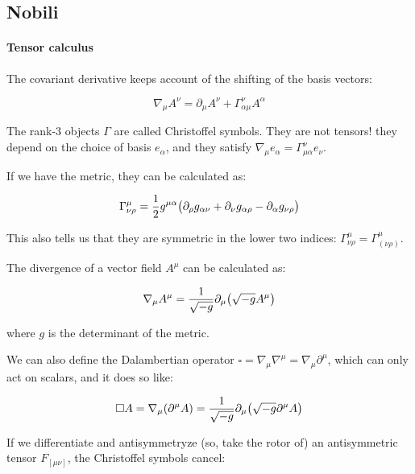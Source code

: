 \subsection{Nobili}

\paragraph{Tensor calculus}

The covariant derivative keeps account of the shifting of the basis vectors:

\begin{equation}
    \nabla_\mu A^\nu = \partial_\mu A^\nu + \Gamma^\nu _{\alpha \mu}  A^\alpha
\end{equation}

The rank-3 objects $\Gamma$ are called Christoffel symbols. They are not tensors! they depend on the choice of basis $e_\alpha$, and they satisfy $\nabla _\mu e_\alpha = \Gamma ^\nu _{\mu \alpha} e_\nu$.

If we have the metric, they can be calculated as:

\begin{equation}
    \Gamma^\mu_{\nu \rho} = \frac{1}{2} g^{\mu \alpha} \qty(
    \partial_\rho g_{\alpha \nu} +
    \partial_\nu g_{\alpha \rho} -
    \partial_\alpha g_{\nu \rho}
    ) \label{eq:christoffel-symbols-from-metric}
\end{equation}

This also tells us that they are symmetric in the lower two indices: $\Gamma ^\mu _{\nu \rho} = \Gamma ^\mu _{(\nu \rho)}$.

The divergence of a vector field $A^\mu$ can be calculated as:

\begin{equation}
    \nabla_\mu A^\mu = \frac{1}{\sqrt{-g}}\partial_\mu \qty(\sqrt{-g}A^\mu) \label{eq:covariant-divergence}
\end{equation}

where $g$ is the determinant of the metric.

We can also define the Dalambertian operator $\square = \nabla_\mu \nabla^\mu = \nabla_\mu \partial^\mu$, which can only act on scalars, and it does so like:

\begin{equation}
    \square A = \nabla_\mu (\partial^\mu A) =  \frac{1}{\sqrt{-g}}\partial_\mu \qty(\sqrt{-g}\partial^\mu A)
\end{equation}

If we differentiate and antisymmetryze (so, take the rotor of) an antisymmetric tensor $F_{[\mu \nu]}$, the Christoffel symbols cancel:

